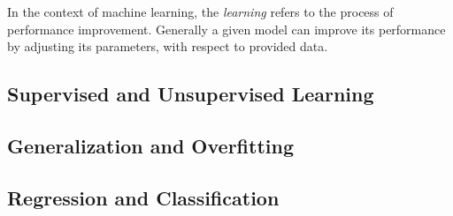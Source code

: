 In the context of machine learning, the \textit{learning} refers to the process of performance improvement.
Generally a given model can improve its performance by adjusting its parameters, with respect to provided data. 

\subsection{Supervised and Unsupervised Learning}

\subsection{Generalization and Overfitting}

\subsection{Regression and Classification}







